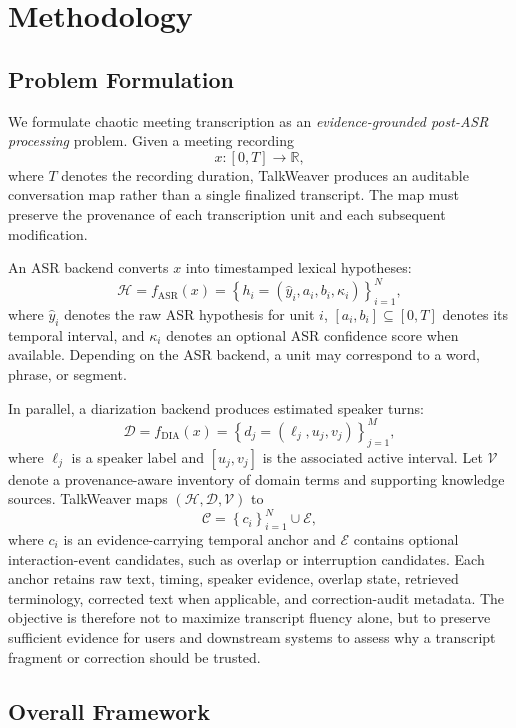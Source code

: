 \documentclass[10pt,twocolumn]{article}
\begin{document}
\section{Methodology}
\label{sec:method}

\subsection{Problem Formulation}

We formulate chaotic meeting transcription as an \emph{evidence-grounded post-ASR processing} problem. Given a meeting recording
\[
x:[0,T]\rightarrow \mathbb{R},
\]
where \(T\) denotes the recording duration, TalkWeaver produces an auditable conversation map rather than a single finalized transcript. The map must preserve the provenance of each transcription unit and each subsequent modification.

An ASR backend converts \(x\) into timestamped lexical hypotheses:
\[
\mathcal{H}
=
f_{\mathrm{ASR}}(x)
=
\left\{
h_i=(\hat{y}_i,a_i,b_i,\kappa_i)
\right\}_{i=1}^{N},
\]
where \(\hat{y}_i\) denotes the raw ASR hypothesis for unit \(i\), \([a_i,b_i]\subseteq[0,T]\) denotes its temporal interval, and \(\kappa_i\) denotes an optional ASR confidence score when available. Depending on the ASR backend, a unit may correspond to a word, phrase, or segment.

In parallel, a diarization backend produces estimated speaker turns:
\[
\mathcal{D}
=
f_{\mathrm{DIA}}(x)
=
\left\{
d_j=(\ell_j,u_j,v_j)
\right\}_{j=1}^{M},
\]
where \(\ell_j\) is a speaker label and \([u_j,v_j]\) is the associated active interval. Let \(\mathcal{V}\) denote a provenance-aware inventory of domain terms and supporting knowledge sources. TalkWeaver maps \((\mathcal{H},\mathcal{D},\mathcal{V})\) to
\[
\mathcal{C}
=
\left\{
c_i
\right\}_{i=1}^{N}
\cup
\mathcal{E},
\]
where \(c_i\) is an evidence-carrying temporal anchor and \(\mathcal{E}\) contains optional interaction-event candidates, such as overlap or interruption candidates. Each anchor retains raw text, timing, speaker evidence, overlap state, retrieved terminology, corrected text when applicable, and correction-audit metadata. The objective is therefore not to maximize transcript fluency alone, but to preserve sufficient evidence for users and downstream systems to assess why a transcript fragment or correction should be trusted.

\subsection{Overall Framework}
\end{document}
